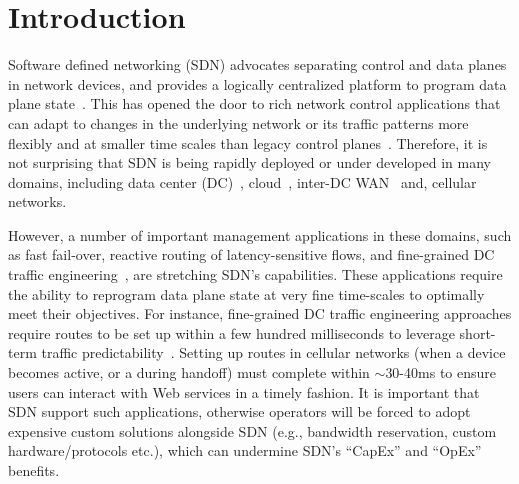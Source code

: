 \section{Introduction}\label{sec-intro}

Software defined networking (SDN) advocates separating control and
data planes in network devices, and provides a logically centralized
platform to program data plane state~\cite{openflow,rethinking}.
This has opened the door to rich network control applications that can
adapt to changes in the underlying network or its traffic patterns
more flexibly and at smaller time scales than legacy control
planes~\cite{swan,b4,ananta,simple,elastictree,softcell}. %
Therefore, it is not surprising that SDN is being rapidly deployed or under developed in
many domains, including data center (DC)~\cite{zupdate,microte,elastictree},
cloud~\cite{ananta}, inter-DC WAN~\cite{b4,swan} and,
cellular~\cite{softcell} networks.


However, a number of important management applications in these
domains, such as fast fail-over, reactive routing of latency-sensitive
flows, and fine-grained DC traffic engineering~\cite{microte}, are
stretching SDN's capabilities. These applications require the ability
to reprogram data plane state at very fine time-scales to optimally
meet their objectives. For instance,
fine-grained DC traffic engineering approaches require routes to be
set up within a few hundred milliseconds to leverage short-term traffic
predictability~\cite{microte}. Setting up routes in
cellular networks (when a device becomes active, or a during handoff)
must complete within $\sim$30-40ms to ensure users can interact with
Web services in a timely fashion. It is important that SDN support
such applications, otherwise operators will be forced to adopt
expensive custom solutions alongside SDN (e.g., bandwidth reservation,
custom hardware/protocols etc.), which can undermine SDN's ``CapEx''
and ``OpEx'' benefits.

